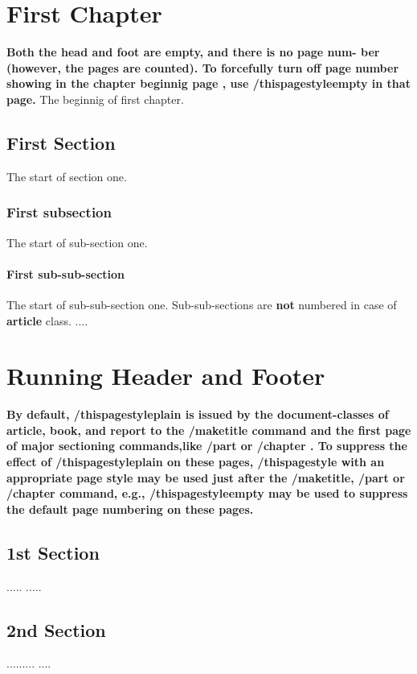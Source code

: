 \documentclass[openany]{book} %
\begin{document}
\chapter{First Chapter}

{\large\bf Both the head and foot are empty, and there is no page num- ber (however, the pages are counted).
To forcefully turn off page number showing in the chapter beginnig page , use /thispagestyle{empty} in that page.}
	The beginnig of first chapter.
		\section{First Section}
		The start of section one.
			\subsection{First subsection}
			The start of sub-section one.
				\subsubsection{First sub-sub-section}
					The start of sub-sub-section one. Sub-sub-sections are {\bf\Huge not} numbered in case of {\bf\huge article} class.
					\newpage
					....
\chapter{Running Header and Footer}
\bfseries\large
By default, /thispagestyle{plain} is issued by the document-classes of article, book, and report to the 
/maketitle command and the first page of major sectioning commands,like /part{ } or /chapter{ }. 
To suppress the effect of /thispagestyle{plain} on these pages, /thispagestyle{ } with an appropriate
 page style may be used just after the /maketitle, /part{ } or /chapter{ } command, 
 e.g., /thispagestyle{empty} may be used to suppress the default page numbering on these pages.
    \section{1st Section}
    .....
    \newpage
    .....
    \newpage
    \section{2nd Section}
    .........
    \newpage
    ....
\end{document}
